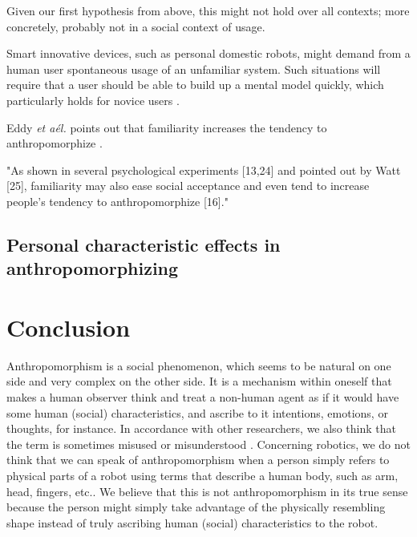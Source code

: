 \documentclass[twocolumn]{svjour3}          %
\begin{document}
Given our first hypothesis from above, this might not hold over all contexts; more concretely, probably not in a social context of usage.


	Smart innovative devices, such as personal domestic robots, might demand from a human user spontaneous usage of an unfamiliar system. Such situations will require that a user should be able to build up a mental model quickly, which particularly holds for novice users \cite{schmitz_concepts_2011}.

	Eddy \textit{et aél.} points out that familiarity increases the tendency to anthropomorphize \cite{eddy_attribution_1993}.

	"As shown in several psychological experiments [13,24] and pointed out by Watt [25], familiarity may also ease social acceptance and even tend to increase people's tendency to anthropomorphize [16]." \cite{duffy_anthropomorphism_2003}

\subsection{Personal characteristic effects in anthropomorphizing}
\label{sec:8.3}



%
%
%
%
%
%


\section{Conclusion}
\label{sec:9}


	Anthropomorphism is a social phenomenon, which seems to be natural on one side and very complex on the other side. It is a mechanism within oneself that makes a human observer think and treat a non-human agent as if it would have some human (social) characteristics, and ascribe to it intentions, emotions, or thoughts, for instance. In accordance with other researchers, we also think that the term is sometimes misused or misunderstood \cite{duffy_anthropomorphism_2002}. Concerning robotics, we do not think that we can speak of anthropomorphism when a person simply refers to physical parts of a robot using terms that describe a human body, such as arm, head, fingers, etc.. We believe that this is not anthropomorphism in its true sense because the person might simply take advantage of the physically resembling shape instead of truly ascribing human (social) characteristics to the robot.
\end{document}
